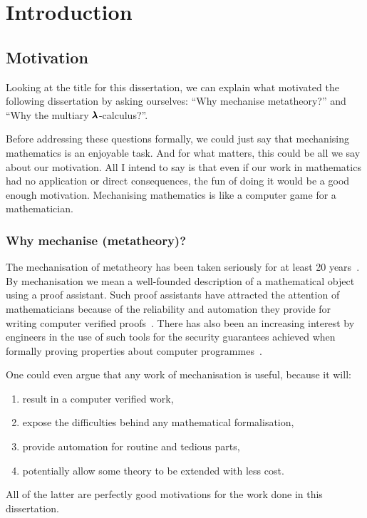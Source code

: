 \chapter{Introduction}
\label{c:intro}

\section{Motivation}
Looking at the title for this dissertation, we can explain what motivated the following dissertation by asking ourselves: ``Why mechanise metatheory?'' and ``Why the multiary $\pmb{\lambda}$-calculus?''.

Before addressing these questions formally, we could just say that mechanising mathematics is an enjoyable task.
And for what matters, this could be all we say about our motivation.
All I intend to say is that even if our work in mathematics had no application or direct consequences, the fun of doing it would be a good enough motivation.
Mechanising mathematics is like a computer game for a mathematician.

\subsection{Why mechanise (metatheory)?}
The mechanisation of metatheory has been taken seriously for at least 20 years~\cite{POPLmark}.
By mechanisation we mean a well-founded description of a mathematical object using a proof assistant.
Such proof assistants have attracted the attention of mathematicians because of the reliability and automation they provide for writing computer verified proofs~\cite{FourColourThm}.
There has also been an increasing interest by engineers in the use of such tools for the security guarantees achieved when formally proving properties about computer programmes~\cite{CompCert}.

One could even argue that any work of mechanisation is useful, because it will:
\begin{enumerate}
\item result in a computer verified work,
\item expose the difficulties behind any mathematical formalisation,
\item provide automation for routine and tedious parts,
\item potentially allow some theory to be extended with less cost.
\end{enumerate}

All of the latter are perfectly good motivations for the work done in this dissertation.

